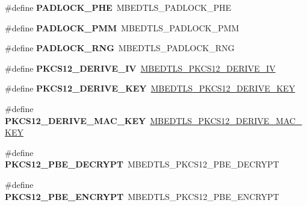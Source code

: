\begin{DoxyCompactItemize}
\#define {\bfseries P\+A\+D\+L\+O\+C\+K\+\_\+\+P\+HE}~M\+B\+E\+D\+T\+L\+S\+\_\+\+P\+A\+D\+L\+O\+C\+K\+\_\+\+P\+HE
\item 
\mbox{\label{compat-1_83_8h_a22968b34e8f6b8b095f0a5d5aa7e1df5}} 
\#define {\bfseries P\+A\+D\+L\+O\+C\+K\+\_\+\+P\+MM}~M\+B\+E\+D\+T\+L\+S\+\_\+\+P\+A\+D\+L\+O\+C\+K\+\_\+\+P\+MM
\item 
\mbox{\label{compat-1_83_8h_a3eb797ca24be7c69bbce6a6c37e094d8}} 
\#define {\bfseries P\+A\+D\+L\+O\+C\+K\+\_\+\+R\+NG}~M\+B\+E\+D\+T\+L\+S\+\_\+\+P\+A\+D\+L\+O\+C\+K\+\_\+\+R\+NG
\item 
\mbox{\label{compat-1_83_8h_ab7eb878060cdcbaf9ef6722a1b8eb955}} 
\#define {\bfseries P\+K\+C\+S12\+\_\+\+D\+E\+R\+I\+V\+E\+\_\+\+IV}~\mbox{\hyperlink{pkcs12_8h_ad8ac9a220c8d237a9a5bc972daed1c13}{M\+B\+E\+D\+T\+L\+S\+\_\+\+P\+K\+C\+S12\+\_\+\+D\+E\+R\+I\+V\+E\+\_\+\+IV}}
\item 
\mbox{\label{compat-1_83_8h_a0097fb65a04f5e2084cfd3adf89a82e1}} 
\#define {\bfseries P\+K\+C\+S12\+\_\+\+D\+E\+R\+I\+V\+E\+\_\+\+K\+EY}~\mbox{\hyperlink{pkcs12_8h_ad9b0f41c74cd6a8e072c84b5d310b331}{M\+B\+E\+D\+T\+L\+S\+\_\+\+P\+K\+C\+S12\+\_\+\+D\+E\+R\+I\+V\+E\+\_\+\+K\+EY}}
\item 
\mbox{\label{compat-1_83_8h_a63fe520ec518c16960a42ee4819f3977}} 
\#define {\bfseries P\+K\+C\+S12\+\_\+\+D\+E\+R\+I\+V\+E\+\_\+\+M\+A\+C\+\_\+\+K\+EY}~\mbox{\hyperlink{pkcs12_8h_a91d3d19fb1a5cd18648f363eff8617ec}{M\+B\+E\+D\+T\+L\+S\+\_\+\+P\+K\+C\+S12\+\_\+\+D\+E\+R\+I\+V\+E\+\_\+\+M\+A\+C\+\_\+\+K\+EY}}
\item 
\mbox{\label{compat-1_83_8h_a5b444102c7edd3a54436645d52706498}} 
\#define {\bfseries P\+K\+C\+S12\+\_\+\+P\+B\+E\+\_\+\+D\+E\+C\+R\+Y\+PT}~M\+B\+E\+D\+T\+L\+S\+\_\+\+P\+K\+C\+S12\+\_\+\+P\+B\+E\+\_\+\+D\+E\+C\+R\+Y\+PT
\item 
\mbox{\label{compat-1_83_8h_a6cadcbe1c384d25892634c43169415bc}} 
\#define {\bfseries P\+K\+C\+S12\+\_\+\+P\+B\+E\+\_\+\+E\+N\+C\+R\+Y\+PT}~M\+B\+E\+D\+T\+L\+S\+\_\+\+P\+K\+C\+S12\+\_\+\+P\+B\+E\+\_\+\+E\+N\+C\+R\+Y\+PT
\item 
\mbox{\label{compat-1_83_8h_abb7e70622c3563f184286355e9408a35}} 

\end{DoxyCompactItemize}
